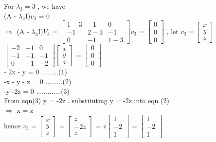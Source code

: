 \documentclass[12pt,a4paper]{article}
\begin{document}
 For $\lambda_3 = 3$ , we have \\
 (A - $\lambda_3$I)$v_3$ = 0\vspace{5mm}\\
 $\Longrightarrow$ (A - $\lambda_3$I)$V_3$ = $\begin{bmatrix}
 1 - 3&-1&0\\ -1&2 - 3&-1\\ 0&-1&1 - 3
 \end{bmatrix}v_3$ = $\begin{bmatrix}
 0\\0\\0
 \end{bmatrix}$ , let $v_3 = \begin{bmatrix}
 x\\y\\z
 \end{bmatrix}$\vspace{5mm}\\
 $\begin{bmatrix}
 -2&-1&0\\ -1&-1&-1\\ 0&-1&-2
 \end{bmatrix}\begin{bmatrix}
 x\\y\\z
 \end{bmatrix}$ = $\begin{bmatrix}
 0\\0\\0
 \end{bmatrix}$\vspace{5mm}\\
 - 2x - y = 0 .........(1)\\
 -x - y - z = 0 .........(2)\\
 -y -2z = 0 .............(3)\\
 From eqn(3) y = -2z . substituting y = -2z into eqn (2)\\
 $\Longrightarrow$ x = z\vspace{5mm}\\
 hence $v_3$ = $\begin{bmatrix}
 x\\y\\z
 \end{bmatrix}$ =  $\begin{bmatrix}
 z\\-2z\\z
 \end{bmatrix}$ = z$\begin{bmatrix}
 1\\-2\\1
 \end{bmatrix}$ = $\begin{bmatrix}
 1\\-2\\1
 \end{bmatrix}$ 
\end{document}
